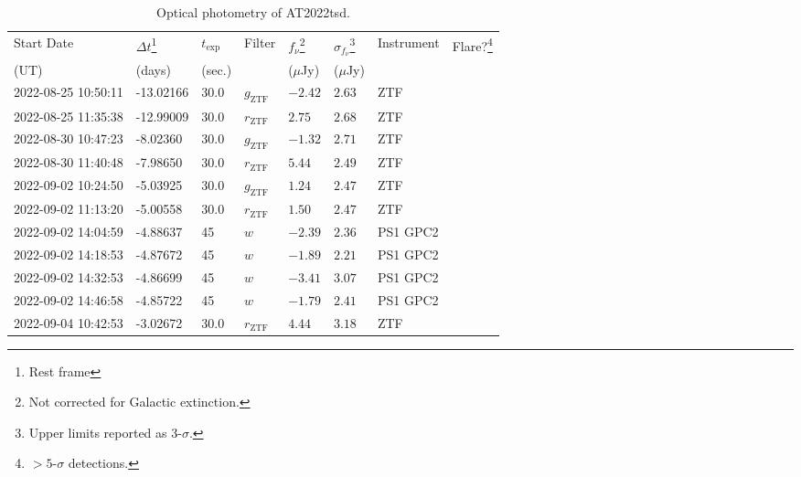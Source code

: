 \documentclass{nature_plusfigure}
\begin{document}
\begin{supplement}

\renewcommand{\thefigure}{Supplementary Information Figure~\arabic{figure}}
\renewcommand{\figurename}{}
\setcounter{figure}{0}
%


\renewcommand{\thetable}{Supplementary Information Table~\arabic{table}}
 \renewcommand{\tablename}{}
\setcounter{table}{0}

\begin{center} 
\begin{longtable}{llllllll} 
\caption{Optical photometry of AT2022tsd.} 
\label{tab:optical-photometry}\\ 
\hline\hline
Start Date & $\Delta t$\footnote{Rest frame} & $t_\mathrm{exp}$ & Filter & $f_\nu$\footnote{Not corrected for Galactic extinction.} & $\sigma_{f_\nu}$\footnote{Upper limits reported as 3-$\sigma$.} & Instrument & Flare?\footnote{$>5$-$\sigma$ detections.}\\ 
(UT) & (days) & (sec.) &  & ($\mu$Jy) & ($\mu$Jy) &  & \\ 
\hline
2022-08-25 10:50:11 & -13.02166 & 30.0 & ${g}_\mathrm{ZTF}$ & $-2.42$ & $2.63$ & ZTF &  \\ 
2022-08-25 11:35:38 & -12.99009 & 30.0 & ${r}_\mathrm{ZTF}$ & $2.75$ & $2.68$ & ZTF &  \\ 
2022-08-30 10:47:23 & -8.02360 & 30.0 & ${g}_\mathrm{ZTF}$ & $-1.32$ & $2.71$ & ZTF &  \\ 
2022-08-30 11:40:48 & -7.98650 & 30.0 & ${r}_\mathrm{ZTF}$ & $5.44$ & $2.49$ & ZTF &  \\ 
2022-09-02 10:24:50 & -5.03925 & 30.0 & ${g}_\mathrm{ZTF}$ & $1.24$ & $2.47$ & ZTF &  \\ 
2022-09-02 11:13:20 & -5.00558 & 30.0 & ${r}_\mathrm{ZTF}$ & $1.50$ & $2.47$ & ZTF &  \\ 
2022-09-02 14:04:59 & -4.88637 & 45 & $w$ & $-2.39$ & $2.36$ & PS1 GPC2 &  \\ 
2022-09-02 14:18:53 & -4.87672 & 45 & $w$ & $-1.89$ & $2.21$ & PS1 GPC2 &  \\ 
2022-09-02 14:32:53 & -4.86699 & 45 & $w$ & $-3.41$ & $3.07$ & PS1 GPC2 &  \\ 
2022-09-02 14:46:58 & -4.85722 & 45 & $w$ & $-1.79$ & $2.41$ & PS1 GPC2 &  \\ 
2022-09-04 10:42:53 & -3.02672 & 30.0 & ${r}_\mathrm{ZTF}$ & $4.44$ & $3.18$ & ZTF &  \\ 

\end{longtable}
\end{center}
\end{supplement}
\end{document}
